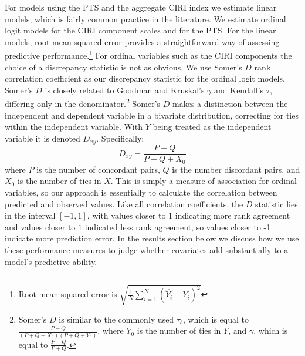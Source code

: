\documentclass[12pt]{article}
\begin{document}
For models using the PTS and the aggregate CIRI index we estimate linear models, which is fairly common practice in the literature. We estimate ordinal logit models for the CIRI component scales and for the PTS. For the linear models, root mean squared error provides a straightforward way of assessing predictive performance.\footnote{Root mean squared error is $\displaystyle \sqrt{\frac{1}{N} \sum\limits_{i=1}^N (\hat{Y_{i}} - Y_{i})^2} $} For ordinal variables such as the CIRI components the choice of a discrepancy statistic is not as obvious. We use Somer's $D$ rank correlation coefficient  \citep{Somers1962} as our discrepancy statistic for the ordinal logit models.
Somer's $D$ is closely related to Goodman and Kruskal's $\gamma$ and Kendall's $\tau$, differing only in the denominator.\footnote{Somer's $D$ is similar to the commonly used $\tau_b$, which is equal to $\frac{P - Q}{(P+Q+X_0)(P+Q+Y_0)}$, where $Y_0$ is the number of ties in $Y$, and $\gamma$, which is equal to $\frac{P - Q}{P + Q}$.} Somer's $D$ makes a distinction between the independent and dependent variable in a bivariate distribution, correcting for ties within the independent variable. With $Y$ being treated as the independent variable it is denoted $D_{xy}$. 
Specifically:
$$D_{xy} = \frac{P - Q}{P + Q + X_0}$$
\noindent where $P$ is the number of concordant pairs, $Q$ is the number discordant pairs, and $X_0$ is the number of ties in $X$. This is simply a measure of association for ordinal variables, so our approach is essentially to calculate the correlation between predicted and observed values. Like all correlation coefficients, the $D$ statistic lies in the interval $[-1, 1]$, with values closer to $1$ indicating more rank agreement and values closer to $1$ indicated less rank agreement, so values closer to -1 indicate more prediction error. In the results section below we discuss how we use these performance measures to judge whether covariates add substantially to a model's predictive ability.
\end{document}
